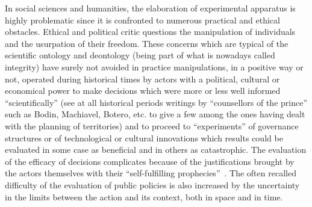 \documentclass[10pt]{article}
\begin{document}
In social sciences and humanities, the elaboration of experimental apparatus is highly problematic since it is confronted to numerous practical and ethical obstacles. Ethical and political critic questions the manipulation of individuals and the usurpation of their freedom. These concerns which are typical of the scientific ontology and deontology (being part of what is nowadays called integrity) have surely not avoided in practice manipulations, in a positive way or not, operated during historical times by actors with a political, cultural or economical power to make decisions which were more or less well informed ``scientifically'' (see at all historical periods writings by ``counsellors of the prince'' such as Bodin, Machiavel, Botero, etc. to give a few among the ones having dealt with the planning of territories) and to proceed to ``experiments'' of governance structures or of technological or cultural innovations which results could be evaluated in some case as beneficial and in others as catastrophic. The evaluation of the efficacy of decisions complicates because of the justifications brought by the actors themselves with their ``self-fulfilling prophecies''~\citep{}. The often recalled difficulty of the evaluation of public policies is also increased by the uncertainty in the limits between the action and its context, both in space and in time.
\end{document}
